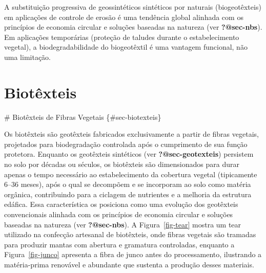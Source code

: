 \documentclass[
  portuguese,
  11pt,
  a4paper,
  open=any]{scrbook}
\begin{document}
\begin{tcolorbox}[enhanced jigsaw, leftrule=.75mm, colframe=quarto-callout-note-color-frame, colback=white, bottomrule=.15mm, opacityback=0, colbacktitle=quarto-callout-note-color!10!white, breakable, bottomtitle=1mm, opacitybacktitle=0.6, title=\textcolor{quarto-callout-note-color}{\faInfo}\hspace{0.5em}{Tendência}, titlerule=0mm, toprule=.15mm, toptitle=1mm, rightrule=.15mm, left=2mm, arc=.35mm, coltitle=black]

A substituição progressiva de geossintéticos sintéticos por naturais
(biogeotêxteis) em aplicações de controle de erosão é uma tendência
global alinhada com os princípios de economia circular e soluções
baseadas na natureza (ver \textbf{?@sec-nbs}). Em aplicações temporárias
(proteção de taludes durante o estabelecimento vegetal), a
biodegradabilidade do biogeotêxtil é uma vantagem funcional, não uma
limitação.

\end{tcolorbox}

\chapter{Biotêxteis}\label{biotuxeaxteis}

\# Biotêxteis de Fibras Vegetais \{\#sec-biotexteis\}

Os biotêxteis são geotêxteis fabricados exclusivamente a partir de
fibras vegetais, projetados para biodegradação controlada após o
cumprimento de sua função protetora. Enquanto os geotêxteis sintéticos
(ver \textbf{?@sec-geotexteis}) persistem no solo por décadas ou
séculos, os biotêxteis são dimensionados para durar apenas o tempo
necessário ao estabelecimento da cobertura vegetal (tipicamente 6--36
meses), após o qual se decompõem e se incorporam ao solo como matéria
orgânica, contribuindo para a ciclagem de nutrientes e a melhoria da
estrutura edáfica. Essa característica os posiciona como uma evolução
dos geotêxteis convencionais alinhada com os princípios de economia
circular e soluções baseadas na natureza (ver \textbf{?@sec-nbs}). A
Figura~\ref{fig-tear} mostra um tear utilizado na confecção artesanal de
biotêxteis, onde fibras vegetais são tramadas para produzir mantas com
abertura e gramatura controladas, enquanto a Figura~\ref{fig-junco}
apresenta a fibra de junco antes do processamento, ilustrando a
matéria-prima renovável e abundante que sustenta a produção desses
materiais.
\end{document}

